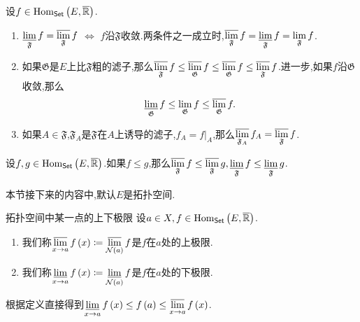 \begin{corollary}{}{}
	设$f\in\operatorname{Hom}_{\mathsf{Set}}\left(E,\overline{\mathbb{R}}\right)$.
	\begin{enumerate}
		\item $\varliminf\limits_{\mathfrak{F}}f=\varlimsup\limits_{\mathfrak{F}}f$ $\iff$ $f$沿$\mathfrak{F}$收敛.两条件之一成立时,$\varlimsup\limits_{\mathfrak{F}}f=\varliminf\limits_{\mathfrak{F}}f=\displaystyle\lim_{\mathfrak{F}}f$.
		\item 如果$\mathfrak{G}$是$E$上比$\mathfrak{F}$粗的滤子,那么$\varlimsup\limits_{\mathfrak{F}}f\leq\varlimsup\limits_{\mathfrak{G}}f\leq\varlimsup\limits_{\mathfrak{G}}f\leq\varlimsup\limits_{\mathfrak{F}}f$.进一步,如果$f$沿$\mathfrak{G}$收敛,那么
		\begin{align*}
			\varliminf_{\mathfrak{G}}f\leq\displaystyle\lim_{\mathfrak{G}}f\leq\varlimsup\limits_{\mathfrak{G}}f.
		\end{align*}
		\item 如果$A\in\mathfrak{F}$,$\mathfrak{F}_{A}$是$\mathfrak{F}$在$A$上诱导的滤子,$f_{A}=f|_{A}$,那么$\varlimsup\limits_{\mathfrak{F}_{A}}f_{A}=\varlimsup\limits_{\mathfrak{F}}f$.
	\end{enumerate}
\end{corollary}

\begin{proposition}{}{}
	设$f,g\in\operatorname{Hom}_{\mathsf{Set}}\left(E,\overline{\mathbb{R}}\right)$.如果$f\leq g$,那么$\varlimsup\limits_{\mathfrak{F}}f\leq\varlimsup\limits_{\mathfrak{F}}g,\varliminf\limits_{\mathfrak{F}}f\leq\varliminf\limits_{\mathfrak{F}}g$.
\end{proposition}

本节接下来的内容中,默认$E$是拓扑空间.

\begin{definition}{拓扑空间中某一点的上下极限}{}
	设$a\in X,f\in\operatorname{Hom}_{\mathsf{Set}}\left(E,\overline{\mathbb{R}}\right)$.
	\begin{enumerate}
		\item 我们称$\varlimsup\limits_{x\to a}f\left(x\right)\coloneq\varlimsup\limits_{\mathcal{N}\left(a\right)}f$是$f$在$a$处的上极限.
		\item 我们称$\varliminf\limits_{x\to a}f\left(x\right)\coloneq\varliminf\limits_{\mathcal{N}\left(a\right)}f$是$f$在$a$处的下极限.
	\end{enumerate}
\end{definition}

\begin{remark}{}{}
	根据定义直接得到$\varliminf\limits_{x\to a}f\left(x\right)\leq f\left(a\right)\leq\varlimsup\limits_{x\to a}f\left(x\right)$.
\end{remark}


